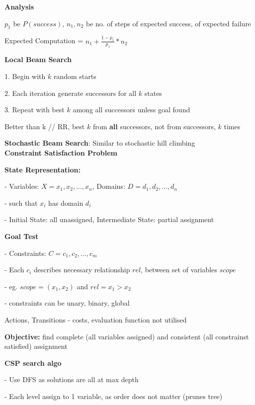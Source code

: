 \documentclass[10pt, a4paper]{article}
\newcommand{\highlight}[1]{{\color{red}\textbf{#1}}}
\newcommand{\red}[1]{{\color{red}#1}}
\newcommand{\green}[1]{{\color{PineGreen}#1}}
\newcommand{\header}[1]{{\normalsize\textbf{#1}}}
\newcommand{\tab}[0]{\hspace*{2mm}}
\begin{document}
\begin{multicols*}{3}
		\textbf{Analysis}

		$p_{1}$ be $P(success)$, $n_{1}, n_2$ be no. of steps of expected success, of expected failure

		\centerline{Expected Computation = $n_{1} + \frac{1 - p_{1}}{p_{1}} * n_{2}$}

		\textbf{Local Beam Search}

		1. Begin with $k$ random starts

		2. Each iteration generate successors for \red{all} $k$ states

		3. Repeat with best $k$ among \red{all} successors unless goal found

		Better than k // RR, best $k$ from \highlight{all} successors, not from successors, $k$ times

		\textbf{Stochastic Beam Search}: Similar to stochastic hill climbing\\

		\header{Constraint Satisfaction Problem}

		\textbf{State Representation:}

		- Variables: $X = {x_{1}, x_{2}, ... , x_{n}}$, Domains: $D = {d_{1}, d_{2}, ... , d_{n}}$

		\tab - such that $x_{i}$ has domain $d_{i}$

		- Initial State: all unassigned, Intermediate State: partial assignment

		\textbf{Goal Test}

		- Constraints: $C = {c_{1}, c_{2}, ... , c_{m}}$

		- Each $c_{i}$ describes necessary relationship $rel$, between set of variables $scope$

		\tab - eg. $scope = (x_{1}, x_{2})$ and $rel = x_{1} > x_{2}$

		- constraints can be \red{unary, binary, global}

		Actions, Transitions - costs, evaluation function not utilised

		\textbf{Objective:} find \green{complete} (all variables assigned) and \green{consistent} (all constrainst satisfied) assignment

		\textbf{CSP search algo}


		- Use DFS as solutions \green{are all at} max depth

		- Each level assign to \green{1 variable}, as order does not matter (prunes tree)


\end{multicols*}
\end{document}

